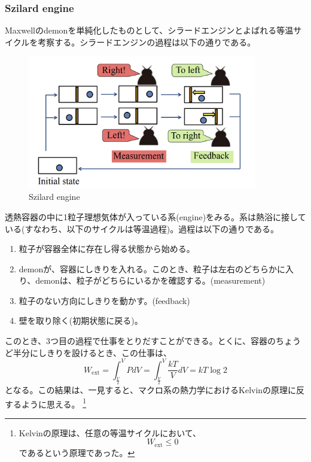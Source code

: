 \documentclass[a4paper,11pt]{jsarticle}
\numberwithin{equation}{section}
\begin{document}
\subsubsection{Szilard engine}
Maxwellのdemonを単純化したものとして、シラードエンジンとよばれる等温サイクルを考察する。シラードエンジンの過程は以下の通りである。\\
\begin{figure}[H]
    \begin{center}
    \includegraphics[width=100mm]{Szilard.png}
    \end{center}
    \caption{Szilard engine}
    \label{fig:Szilard}
\end{figure}
透熱容器の中に1粒子理想気体が入っている系(engine)をみる。系は熱浴に接している(すなわち、以下のサイクルは等温過程)。過程は以下の通りである。
\begin{enumerate}
    \item 粒子が容器全体に存在し得る状態から始める。
    \item demonが、容器にしきりを入れる。このとき、粒子は左右のどちらかに入り、demonは、粒子がどちらにいるかを確認する。(measurement)
    \item 粒子のない方向にしきりを動かす。(feedback)
    \item 壁を取り除く(初期状態に戻る)。
\end{enumerate}
このとき、3つ目の過程で仕事をとりだすことができる。とくに、容器のちょうど半分にしきりを設けるとき、この仕事は、
\begin{equation}
    W_{\text{ext}} = \int_{\frac{V}{2}}^V PdV = \int_{\frac{V}{2}}^V \frac{kT}{V}dV = kT\log 2
\end{equation}
となる。この結果は、一見すると、マクロ系の熱力学におけるKelvinの原理に反するように思える。
\footnote{
    Kelvinの原理は、任意の等温サイクルにおいて、
    \begin{equation}
        W_{\text{ext}} \leq 0
    \end{equation}
    であるという原理であった。
}
\end{document}
